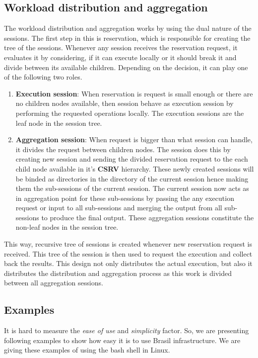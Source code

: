 \documentclass[conference]{sig-alternate}
\begin{document}
\subsection{Workload distribution and aggregation}
The workload distribution and aggregation works by using the dual nature of
the sessions.  The first step in this is reservation, which is responsible for
creating the tree of the sessions.  Whenever any session receives the reservation
request, it evaluates it by considering, if it can execute locally or it should
break it and divide between its available children.  Depending on the decision,
it can play one of the following two roles.
\begin{enumerate}
  \item \textbf{Execution session}: When reservation is request is small enough
  or there are no children nodes available, then session behave as execution
  session by performing the requested operations locally.  The execution
  sessions are the leaf node in the session tree.
  
  \item \textbf{Aggregation session}: When request is bigger than what session
  can handle, it divides the request between children nodes.  The session does
  this by creating new session and sending the divided
  reservation request to the each child node available in it's \textbf{CSRV}
  hierarchy.  These newly created sessions will be binded as directories in the
  directory of the current session hence making them the sub-sessions of the
  current session.  The current session now acts as in aggregation point for
  these sub-sessions by passing the any execution request or input to all
  sub-sessions and merging the output from all sub-sessions to produce the final
  output.  These aggregation sessions constitute the non-leaf nodes in the
  session tree.
\end{enumerate}
This way, recursive tree of sessions is created whenever new reservation request
is received.  This tree of the session is then used to request the execution and
collect back the results.  This design not only distributes the actual
execution, but also it distributes the distribution and aggregation process as
this work is divided between all aggregation sessions.

\subsection{Examples}
It is hard to measure the \textit{ease of use} and \textit{simplicity}
factor.  So, we are presenting following examples to show how easy it is
to use Brasil infrastructure.  We are giving these examples of using the bash
shell in Linux.
\end{document}
